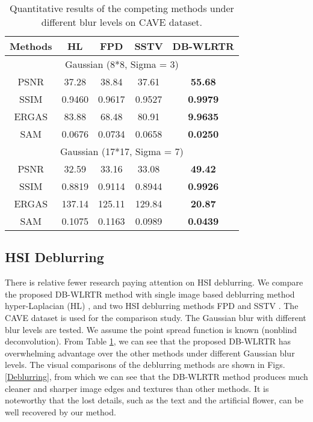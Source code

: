 \documentclass[twocolumn]{svjour3}          %
\begin{document}
\begin{table}[tbp]
\centering
\renewcommand{\arraystretch}{1.2}
\caption{Quantitative results of the competing methods under different blur levels on CAVE dataset.}
\label{CAVE deblurring quantitative}
\begin{tabular}{|c|c|c|c|c|}
\hline
Methods  & HL      & FPD    & SSTV   & DB-WLRTR \\ \hline
\multicolumn{5}{|c|}{Gaussian (8*8, Sigma = 3)}   \\ \hline
PSNR     & 37.28   & 38.84  & 37.61  & \textbf{55.68}    \\ \hline
SSIM     & 0.9460  & 0.9617 & 0.9527 & \textbf{0.9979}   \\ \hline
ERGAS    & 83.88   & 68.48  & 80.91  & \textbf{9.9635}   \\ \hline
SAM      & 0.0676  & 0.0734 & 0.0658 & \textbf{0.0250 }  \\ \hline
\multicolumn{5}{|c|}{Gaussian (17*17, Sigma = 7)} \\ \hline
PSNR     & 32.59   & 33.16  & 33.08  & \textbf{49.42}    \\ \hline
SSIM     & 0.8819  & 0.9114 & 0.8944 & \textbf{0.9926 }  \\ \hline
ERGAS    & 137.14  & 125.11 & 129.84 & \textbf{20.87}    \\ \hline
SAM      & 0.1075  & 0.1163 & 0.0989 & \textbf{0.0439}   \\ \hline
\end{tabular}
\end{table}

  \subsection{HSI Deblurring}
    There is relative fewer research paying attention on HSI deblurring. We compare the proposed DB-WLRTR method with single image based deblurring method hyper-Laplacian (HL) \cite{krishnan2009fast}, and two HSI deblurring methods FPD \cite{henrot2013fast} and SSTV \cite{fang2017hyperspectral}. The CAVE dataset is used for the comparison study. The Gaussian blur with different blur levels are tested. We assume the point spread function is known (nonblind deconvolution). From Table \ref{CAVE deblurring quantitative}, we can see that the proposed DB-WLRTR has overwhelming advantage over the other methods under different Gaussian blur levels. The visual comparisons of the deblurring methods are shown in Figs. \ref{Deblurring}, from which we can see that the DB-WLRTR method produces much cleaner and sharper image edges and textures than other methods. It is noteworthy that the lost details, such as the text and the artificial flower, can be well recovered by our method.
\end{document}
